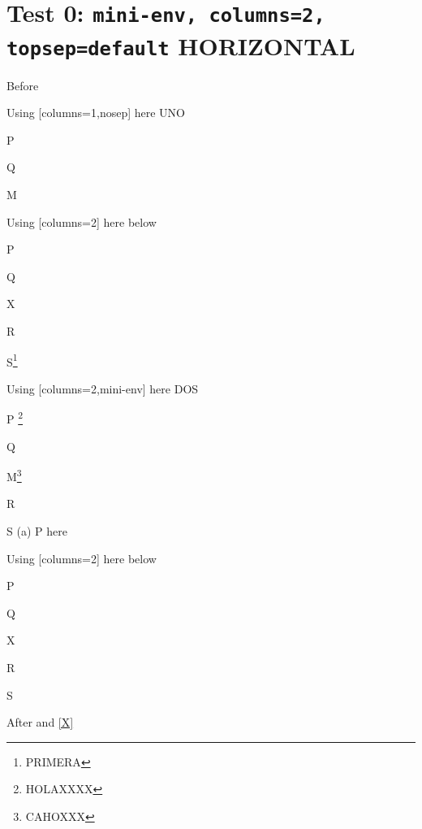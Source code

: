 \documentclass[10pt]{article}
\begin{document}
\section{Test 0: \texttt{mini-env, columns=2, topsep=default} HORIZONTAL}

Before
\begin{enumext}[columns=2,nosep]

\item Using [columns=1,nosep] here UNO
  \begin{enumext}[columns=1,nosep]%
     \item  P \item Q \item M %
  \end{enumext}

\item Using [columns=2] here below
\begin{enumext}[columns=2]%
     \item  P \item Q \item X  \item R \item S\footnote{PRIMERA}
  \end{enumext}

\columnbreak

\item Using [columns=2,mini-env] here DOS
  \begin{enumext}[columns=2,mini-env={0.4\linewidth},nosep,after={\footnotetext[7]{Some text}}]%
    \item  P \footnote{HOLAXXXX}\item Q \item M\label{X}\footnote{CAHOXXX} \item R \item S\footnotemark[7]%
    \miniright
    (a) P here
  \end{enumext}

\item Using [columns=2] here below
\begin{enumext}[columns=2]%
     \item  P \item Q \item X  \item R \item S
  \end{enumext}

\end{enumext}
After  and \ref{X}
\end{document}
